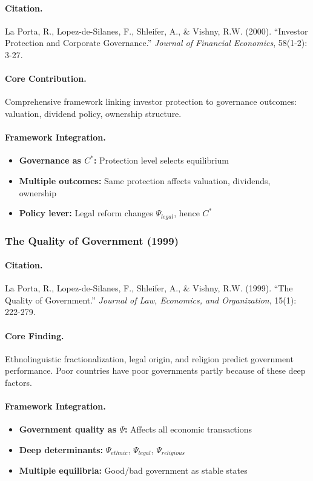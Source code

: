 \documentclass[12pt,a4paper]{article}
\begin{document}
\paragraph{Citation.}
La Porta, R., Lopez-de-Silanes, F., Shleifer, A., \& Vishny, R.W. (2000).
``Investor Protection and Corporate Governance.''
\emph{Journal of Financial Economics}, 58(1-2): 3-27.

\paragraph{Core Contribution.}
Comprehensive framework linking investor protection to governance outcomes:
valuation, dividend policy, ownership structure.

\paragraph{Framework Integration.}
\begin{itemize}
  \item \textbf{Governance as $C^*$:} Protection level selects equilibrium
  \item \textbf{Multiple outcomes:} Same protection affects valuation, dividends, ownership
  \item \textbf{Policy lever:} Legal reform changes $\Psi_{legal}$, hence $C^*$
\end{itemize}

\subsubsection{The Quality of Government (1999)}

\paragraph{Citation.}
La Porta, R., Lopez-de-Silanes, F., Shleifer, A., \& Vishny, R.W. (1999).
``The Quality of Government.''
\emph{Journal of Law, Economics, and Organization}, 15(1): 222-279.

\paragraph{Core Finding.}
Ethnolinguistic fractionalization, legal origin, and religion predict
government performance. Poor countries have poor governments partly
because of these deep factors.

\paragraph{Framework Integration.}
\begin{itemize}
  \item \textbf{Government quality as $\Psi$:} Affects all economic transactions
  \item \textbf{Deep determinants:} $\Psi_{ethnic}$, $\Psi_{legal}$, $\Psi_{religious}$
  \item \textbf{Multiple equilibria:} Good/bad government as stable states
\end{itemize}
\end{document}
